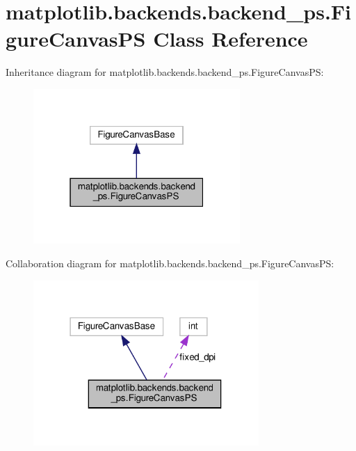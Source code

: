\hypertarget{classmatplotlib_1_1backends_1_1backend__ps_1_1FigureCanvasPS}{}\section{matplotlib.\+backends.\+backend\+\_\+ps.\+Figure\+Canvas\+PS Class Reference}
\label{classmatplotlib_1_1backends_1_1backend__ps_1_1FigureCanvasPS}


Inheritance diagram for matplotlib.\+backends.\+backend\+\_\+ps.\+Figure\+Canvas\+PS\+:
\nopagebreak
\begin{figure}[H]
\begin{center}
\leavevmode
\includegraphics[width=223pt]{classmatplotlib_1_1backends_1_1backend__ps_1_1FigureCanvasPS__inherit__graph}
\end{center}
\end{figure}


Collaboration diagram for matplotlib.\+backends.\+backend\+\_\+ps.\+Figure\+Canvas\+PS\+:
\nopagebreak
\begin{figure}[H]
\begin{center}
\leavevmode
\includegraphics[width=243pt]{classmatplotlib_1_1backends_1_1backend__ps_1_1FigureCanvasPS__coll__graph}
\end{center}
\end{figure}
